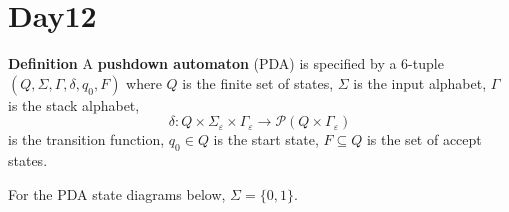 \documentclass[12pt, oneside]{article}
\begin{document}
\begin{flushright}
\end{flushright} \section*{Day12}



{\bf Definition} A {\bf pushdown automaton} (PDA) is  specified by a  $6$-tuple $(Q, \Sigma, \Gamma, \delta, q_0, F)$
where $Q$ is the finite set of states, $\Sigma$ is the input alphabet,  $\Gamma$ is the stack alphabet,
\[
    \delta: Q \times \Sigma_\varepsilon  \times  \Gamma_\varepsilon \to \mathcal{P}( Q \times \Gamma_\varepsilon)
\]
is the transition function,  $q_0 \in Q$ is the start state, $F \subseteq  Q$ is the set of accept states.










For the PDA state diagrams below, $\Sigma = \{0,1\}$.

\vspace{-15pt}
\end{document}
